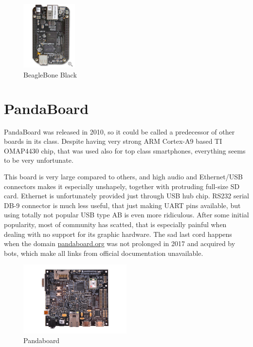 \documentclass[printmode]{mgr}
\begin{document}
\begin{figure}[htbp]
  \centering
    \includegraphics[width=0.25\textwidth]{beaglebone-front.jpg}
  \caption{BeagleBone Black}
  \label{fig:devboard-beaglebone}
\end{figure}

\section{PandaBoard}

PandaBoard was released in 2010, so it could be called a predecessor of other boards in its class. Despite having very strong ARM Cortex-A9 based TI OMAP4430 chip, that was used also for top class smartphones, everything seems to be very unfortunate.

This board is very large compared to others, and high audio and Ethernet/USB connectors makes it especially unshapely, together with protruding full-size SD card. Ethernet is unfortunately provided just through USB hub chip. RS232 serial DB-9 connector is much less useful, that just making UART pins available, but using totally not popular USB type AB is even more ridiculous. After some initial popularity, most of community has scatted, that is especially painful when dealing with no support for its graphic hardware. The sad last cord happens when the domain \url{pandaboard.org} was not prolonged in 2017 and acquired by bots, which make all links from official documentation unavailable.

\begin{figure}[htbp]
  \centering
    \includegraphics[width=0.5\textwidth]{pandaboard-front.png}
  \caption{Pandaboard}
  \label{fig:devboard-pandaboard}
\end{figure}
\end{document}
